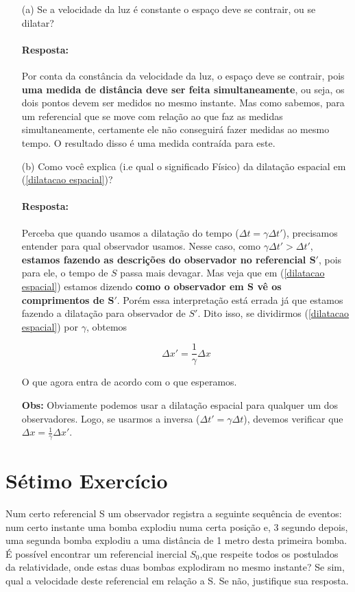 \documentclass[10pt,a4paper]{article}
\begin{document}
	\begin{itemize}
		\item[(a)] Se a velocidade da luz é constante o espaço deve se contrair, ou se dilatar?
		
		\paragraph{Resposta:} Por conta da constância da velocidade da luz, o espaço deve se contrair, pois \textbf{uma medida de distância deve ser feita simultaneamente}, ou seja, os dois pontos devem ser medidos no mesmo instante. Mas como sabemos, para um referencial que se move com relação ao que faz as medidas simultaneamente, certamente ele não conseguirá fazer medidas ao mesmo tempo. O resultado disso é uma medida contraída para este.
		
		
		\item[(b)] Como você explica (i.e qual o significado Físico) da dilatação espacial em (\ref{dilatacao espacial})?
		
		\paragraph{Resposta:}  Perceba que quando usamos a dilatação do tempo ($\Delta t = \gamma \Delta t'$), precisamos entender para qual observador usamos. Nesse caso, como $\gamma \Delta t' > \Delta t'$, \textbf{estamos fazendo as descrições do observador no referencial $\mathbf{S'}$}, pois para ele, o tempo de $S$ passa mais devagar. Mas veja que em (\ref{dilatacao espacial}) estamos dizendo \textbf{como o observador em $\mathbf{S}$ vê os comprimentos de $\mathbf{S'}$}. Porém essa interpretação está errada já que estamos fazendo a dilatação para observador de $S'$. Dito isso, se dividirmos (\ref{dilatacao espacial}) por $\gamma$, obtemos 
		
		\begin{equation}
			\Delta x' = \frac{1}{\gamma}\Delta x
		\end{equation}
		
		O que agora entra de acordo com o que esperamos.
		
		\textbf{Obs:} Obviamente podemos usar a dilatação espacial para qualquer um dos observadores. Logo, se usarmos a inversa ($\Delta t' = \gamma \Delta t$), devemos verificar que $\Delta x = \frac{1}{\gamma}\Delta x'$.
	\end{itemize}
	
	
	\section{Sétimo Exercício}
	Num certo referencial S um observador registra a seguinte sequência de eventos: num certo instante uma bomba explodiu numa certa posição e, 3 segundo depois, uma segunda bomba explodiu a uma distância de 1 metro
	desta primeira bomba. É possível encontrar um referencial inercial $ S_0 $,que respeite todos os postulados da relatividade, onde estas duas bombas explodiram no mesmo instante? Se sim, qual a velocidade deste referencial
	em relação a S. Se não, justifique sua resposta.
	
\end{document}
